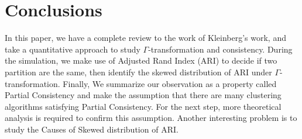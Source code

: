 \documentclass{uonmathreport}
\begin{document}
\section{Conclusions} \label{sec:conclusions}
In this paper, we have a complete review to the work of Kleinberg's work, and take a quantitative approach to study $\Gamma$-transformation and consistency. During the simulation, we make use of Adjusted Rand Index (ARI) to decide if two partition are the same, then identify the skewed distribution of ARI under $\Gamma$-transformation. Finally, We summarize  our observation as a property called Partial Consistency and make the assumption that there are many clustering algorithms satisfying Partial Consistency. For the next step, more theoretical analysis is required to confirm this assumption. Another interesting problem is to study the Causes of Skewed distribution of ARI.


\newpage

\appendix
\end{document}
